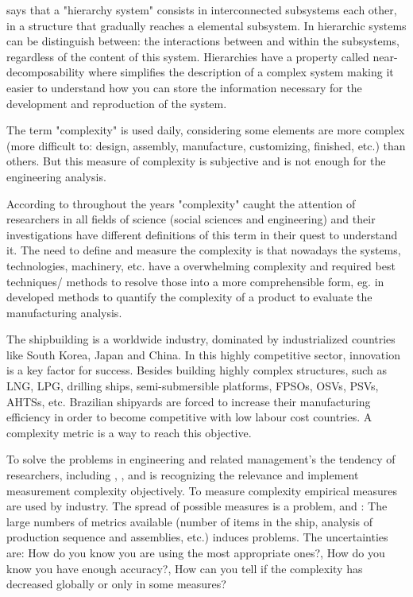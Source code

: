 \cite{Simon62} says that a "hierarchy system" consists in interconnected subsystems each other, in a structure that gradually reaches a elemental subsystem. In hierarchic systems can be distinguish between: the interactions between and within the subsystems, regardless of the content of this system. Hierarchies have a property called near-decomposability where simplifies the description of a complex system making it easier to understand how you can store the information necessary for the development and reproduction of the system.


The term  "complexity" is used daily, considering some elements are more complex (more difficult to: design, assembly, manufacture, customizing, finished, etc.) than others. But this measure of complexity is subjective and is not enough for the engineering analysis.


According to \cite{rodriguez2002} throughout the years "complexity" caught the attention of researchers in all fields of science (social sciences and engineering) and their investigations have different definitions of this term in their quest to understand it. The need to define and measure the complexity is that nowadays the systems, technologies, machinery, etc. have a overwhelming complexity and required best techniques/ methods to resolve those into a more comprehensible form, eg. in \cite{rodriguez2002} developed methods to quantify the complexity of a product to evaluate the manufacturing analysis.


The shipbuilding is a worldwide industry, dominated by industrialized countries like South Korea, Japan and China. In this highly competitive sector, innovation is a key factor for success. Besides building highly complex structures, such as LNG, LPG, drilling ships, semi-submersible platforms, FPSOs, OSVs, PSVs, AHTSs, etc. Brazilian shipyards are forced to increase their manufacturing efficiency in order to become competitive with low labour cost countries. A complexity metric is a way to reach this objective.


To solve the problems in engineering and related management's the tendency of researchers, including \cite{Chryssolouris94}, \cite{Little97}, and \cite{Calinescu00} is recognizing the relevance and implement measurement complexity objectively. To measure complexity empirical measures are used by industry. The spread of possible measures is a problem, \cite{ElMaraghy12} and \cite{Milner13}: The large numbers of metrics available (number of items in the ship, analysis of production sequence and assemblies, etc.) induces problems. The uncertainties are: How do you know you are using the most appropriate ones?, How do you know you have enough accuracy?, How can you tell if the complexity has decreased globally or only in some measures?
